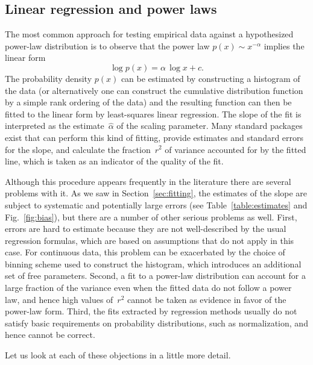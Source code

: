 \documentclass[final]{siamltex}
\begin{document}

\begin{appendix}

\section{Linear regression and power laws}
\label{appendix:linear_regression}
The most common approach for testing empirical data against a hypothesized
power-law distribution is to observe that the power law $p(x) \sim
x^{-\alpha}$ implies the linear form
\begin{equation}
\log p(x) = \alpha\,\log x + c.
\end{equation}
The probability density $p(x)$ can be estimated by constructing a histogram
of the data (or alternatively one can construct the cumulative distribution
function by a simple rank ordering of the data) and the resulting function
can then be fitted to the linear form by least-squares linear regression.
The slope of the fit is interpreted as the estimate~$\hat{\alpha}$ of the
scaling parameter.  Many standard packages exist that can perform this kind
of fitting, provide estimates and standard errors for the slope, and
calculate the fraction~$r^2$ of variance accounted for by the fitted line,
which is taken as an indicator of the quality of the fit.

Although this procedure appears frequently in the literature there are
several problems with it.  As we saw in Section~\ref{sec:fitting}, the
estimates of the slope are subject to systematic and potentially large
errors (see Table~\ref{table:estimates} and Fig.~\ref{fig:bias}), but there
are a number of other serious problems as well.  First, errors are hard to
estimate because they are not well-described by the usual regression
formulas, which are based on assumptions that do not apply in this case.
For continuous data, this problem can be exacerbated by the choice of
binning scheme used to construct the histogram, which introduces an
additional set of free parameters.  Second, a fit to a power-law
distribution can account for a large fraction of the variance even when the
fitted data do not follow a power law, and hence high values of~$r^2$
cannot be taken as evidence in favor of the power-law form.  Third, the
fits extracted by regression methods usually do not satisfy basic
requirements on probability distributions, such as normalization, and hence
cannot be correct.

Let us look at each of these objections in a little more detail.



\end{appendix}
\end{document}
